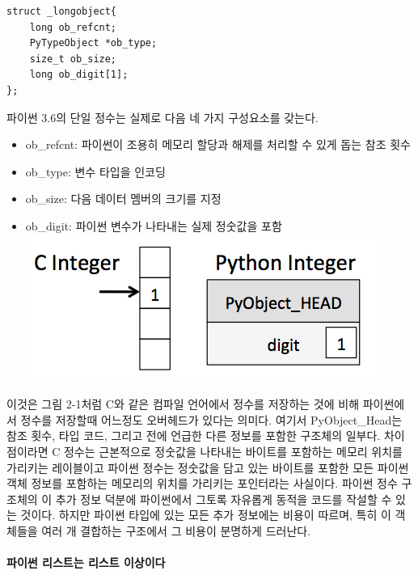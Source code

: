 \documentclass[11pt]{article}
\makeatletter
\def\maxwidth{\ifdim\Gin@nat@width>\linewidth\linewidth
    \else\Gin@nat@width\fi}
\let\Oldincludegraphics\includegraphics
\renewcommand{\includegraphics}[1]{\Oldincludegraphics[width=.8\maxwidth]{#1}}
\providecommand{\tightlist}{%
      \setlength{\itemsep}{0pt}\setlength{\parskip}{0pt}}
\makeatother
\begin{document}
\begin{verbatim}
struct _longobject{
    long ob_refcnt;
    PyTypeObject *ob_type;
    size_t ob_size;
    long ob_digit[1];
};
\end{verbatim}

파이썬 3.6의 단일 정수는 실제로 다음 네 가지 구성요소를 갖는다.

\begin{itemize}
\tightlist
\item
  ob\_refcnt: 파이썬이 조용히 메모리 할당과 해제를 처리할 수 있게 돕는
  참조 횟수
\item
  ob\_type: 변수 타입을 인코딩
\item
  ob\_size: 다음 데이터 멤버의 크기를 지정
\item
  ob\_digit: 파이썬 변수가 나타내는 실제 정숫값을 포함
  \includegraphics{cint_vs_pyint.png}
\end{itemize}

이것은 그림 2-1처럼 C와 같은 컴파일 언어에서 정수를 저장하는 것에 비해
파이썬에서 정수를 저장할때 어느정도 오버헤드가 있다는 의미다. 여기서
PyObject\_Head는 참조 횟수, 타입 코드, 그리고 전에 언급한 다른 정보를
포함한 구조체의 일부다. 차이점이라면 C 정수는 근본적으로 정숫값을
나타내는 바이트를 포함하는 메모리 위치를 가리키는 레이블이고 파이썬
정수는 정숫값을 담고 있는 바이트를 포함한 모든 파이썬 객체 정보를
포함하는 메모리의 위치를 가리키는 포인터라는 사실이다. 파이썬 정수
구조체의 이 추가 정보 덕분에 파이썬에서 그토록 자유롭게 동적을 코드를
작설할 수 있는 것이다. 하지만 파이썬 타입에 있는 모든 추가 정보에는
비용이 따르며, 특히 이 객체들을 여러 개 결합하는 구조에서 그 비용이
분명하게 드러난다.

    \hypertarget{uxd30cuxc774uxc36c-uxb9acuxc2a4uxd2b8uxb294-uxb9acuxc2a4uxd2b8-uxc774uxc0c1uxc774uxb2e4}{%
\paragraph{파이썬 리스트는 리스트
이상이다}\label{uxd30cuxc774uxc36c-uxb9acuxc2a4uxd2b8uxb294-uxb9acuxc2a4uxd2b8-uxc774uxc0c1uxc774uxb2e4}}
\end{document}
